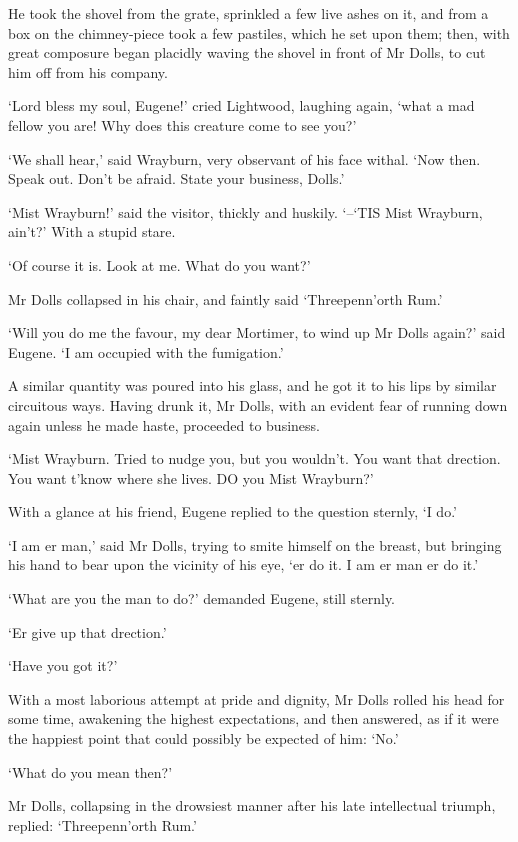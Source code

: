 He took the shovel from the grate, sprinkled a few live ashes on it, and
from a box on the chimney-piece took a few pastiles, which he set upon
them; then, with great composure began placidly waving the shovel in
front of Mr Dolls, to cut him off from his company.

‘Lord bless my soul, Eugene!’ cried Lightwood, laughing again, ‘what a
mad fellow you are! Why does this creature come to see you?’

‘We shall hear,’ said Wrayburn, very observant of his face withal. ‘Now
then. Speak out. Don’t be afraid. State your business, Dolls.’

‘Mist Wrayburn!’ said the visitor, thickly and huskily. ‘--‘TIS Mist
Wrayburn, ain’t?’ With a stupid stare.

‘Of course it is. Look at me. What do you want?’

Mr Dolls collapsed in his chair, and faintly said ‘Threepenn’orth Rum.’

‘Will you do me the favour, my dear Mortimer, to wind up Mr Dolls
again?’ said Eugene. ‘I am occupied with the fumigation.’

A similar quantity was poured into his glass, and he got it to his lips
by similar circuitous ways. Having drunk it, Mr Dolls, with an evident
fear of running down again unless he made haste, proceeded to business.

‘Mist Wrayburn. Tried to nudge you, but you wouldn’t. You want that
drection. You want t’know where she lives. DO you Mist Wrayburn?’

With a glance at his friend, Eugene replied to the question sternly, ‘I
do.’

‘I am er man,’ said Mr Dolls, trying to smite himself on the breast, but
bringing his hand to bear upon the vicinity of his eye, ‘er do it. I am
er man er do it.’

‘What are you the man to do?’ demanded Eugene, still sternly.

‘Er give up that drection.’

‘Have you got it?’

With a most laborious attempt at pride and dignity, Mr Dolls rolled
his head for some time, awakening the highest expectations, and then
answered, as if it were the happiest point that could possibly be
expected of him: ‘No.’

‘What do you mean then?’

Mr Dolls, collapsing in the drowsiest manner after his late intellectual
triumph, replied: ‘Threepenn’orth Rum.’

